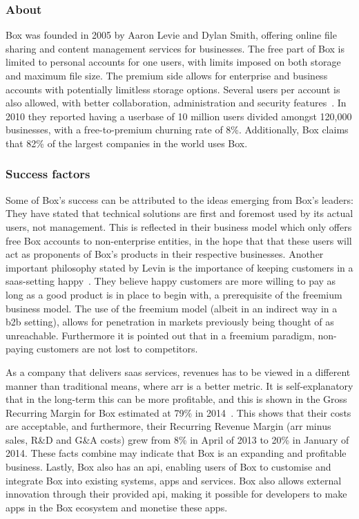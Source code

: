 \subsubsection{About}
Box was founded in 2005 by Aaron Levie and Dylan Smith, offering online file sharing and content management services for businesses. The free part of Box is limited to personal accounts for one users, with limits imposed on both storage and maximum file size. The premium side allows for enterprise and business accounts with potentially limitless storage options. Several users per account is also allowed, with better collaboration, administration and security features~\cite{freemium.orgN/A}. In 2010 they reported having a userbase of 10 million users divided amongst 120,000 businesses, with a free-to-premium churning rate of 8\%. Additionally, Box claims that 82\% of the largest companies in the world uses Box.
\subsubsection{Success factors}
Some of Box's success can be attributed to the ideas emerging from Box's leaders: They have stated that technical solutions are first and foremost used by its actual users, not management. This is reflected in their business model which only offers free Box accounts to non-enterprise entities, in the hope that that these users will act as proponents of Box's products in their respective businesses. Another important philosophy stated by Levin is the importance of keeping customers in a \gls{saas}-setting happy~\cite{tientzuozuora2014}\cite{youtube2011}. They believe happy customers are more willing to pay as long as a good product is in place to begin with, a prerequisite of the freemium business model. The use of the freemium model (albeit in an indirect way in a \gls{b2b} setting), allows for penetration in markets previously being thought of as unreachable. Furthermore it is pointed out that in a freemium paradigm, non-paying customers are not lost to competitors.


As a company that delivers \gls{saas} services, revenues has to be viewed in a different manner than traditional means, where \gls{arr} is a better metric. It is self-explanatory that in the long-term this can be more profitable, and this is shown in the Gross Recurring Margin for Box estimated at 79\% in 2014~\cite{tientzuozuora2014}. This shows that their costs are acceptable, and furthermore, their Recurring Revenue Margin (\gls{arr} minus sales, R\&D and G\&A costs) grew from 8\% in April of 2013 to 20\% in January of 2014. These facts combine may indicate that Box is an expanding and profitable business. Lastly, Box also has an \gls{api}, enabling users of Box to customise and integrate Box into existing systems, apps and services. Box also allows external innovation through their provided \gls{api}, making it possible for developers to make apps in the Box ecosystem and monetise these apps. 

